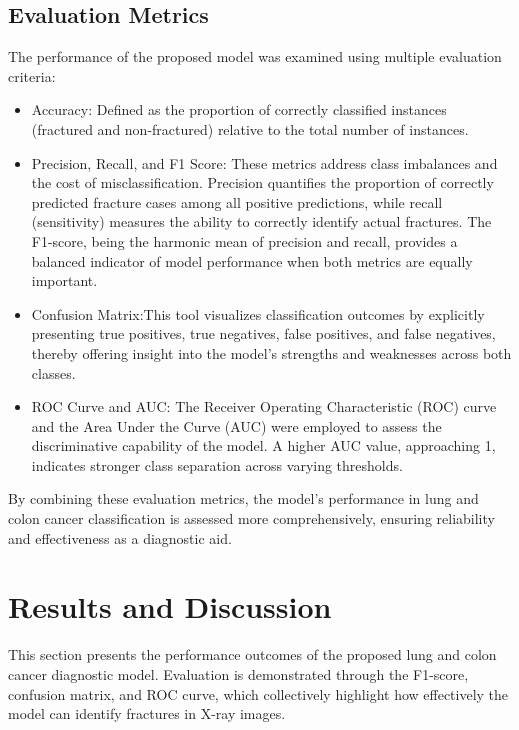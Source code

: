 \documentclass{ieeeaccess}
\begin{document}
\subsection{Evaluation Metrics}
The performance of the proposed model was examined using multiple evaluation criteria:
\begin{itemize}
\item Accuracy: Defined as the proportion of correctly classified instances (fractured and non-fractured) relative to the total number of instances.
\item Precision, Recall, and F1 Score: These metrics address class imbalances and the cost of misclassification. Precision quantifies the proportion of correctly predicted fracture cases among all positive predictions, while recall (sensitivity) measures the ability to correctly identify actual fractures. The F1-score, being the harmonic mean of precision and recall, provides a balanced indicator of model performance when both metrics are equally important.
\item Confusion Matrix:This tool visualizes classification outcomes by explicitly presenting true positives, true negatives, false positives, and false negatives, thereby offering insight into the model’s strengths and weaknesses across both classes.
\item ROC Curve and AUC: The Receiver Operating Characteristic (ROC) curve and the Area Under the Curve (AUC) were employed to assess the discriminative capability of the model. A higher AUC value, approaching 1, indicates stronger class separation across varying thresholds.
\end{itemize}
By combining these evaluation metrics, the model’s performance in lung and colon cancer classification is assessed more comprehensively, ensuring reliability and effectiveness as a diagnostic aid.
\section{Results and Discussion}
This section presents the performance outcomes of the proposed lung and colon cancer diagnostic model. Evaluation is demonstrated through the F1-score, confusion matrix, and ROC curve, which collectively highlight how effectively the model can identify fractures in X-ray images.
\end{document}
